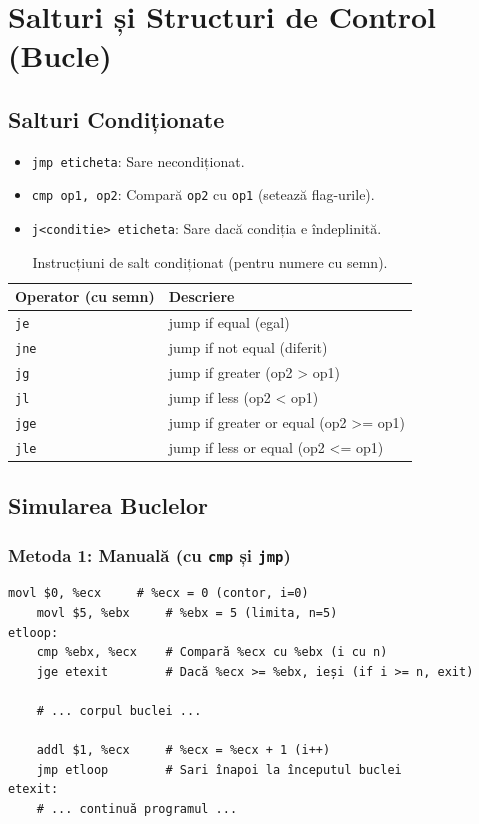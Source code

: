 \documentclass[12pt]{article}
\begin{document}
\section{Salturi și Structuri de Control (Bucle)}

\subsection{Salturi Condiționate}
\begin{itemize}
    \item \texttt{jmp eticheta}: Sare necondiționat.
    \item \texttt{cmp op1, op2}: Compară \texttt{op2} cu \texttt{op1} (setează flag-urile).
    \item \texttt{j<conditie> eticheta}: Sare dacă condiția e îndeplinită.
\end{itemize}

\begin{table}[h!]
\centering
\begin{tabular}{ll}
\toprule
\textbf{Operator (cu semn)} & \textbf{Descriere} \\
\midrule
\texttt{je} & jump if equal (egal) \\
\texttt{jne} & jump if not equal (diferit) \\
\texttt{jg} & jump if greater (op2 > op1) \\
\texttt{jl} & jump if less (op2 < op1) \\
\texttt{jge} & jump if greater or equal (op2 >= op1) \\
\texttt{jle} & jump if less or equal (op2 <= op1) \\
\bottomrule
\end{tabular}
\caption{Instrucțiuni de salt condiționat (pentru numere cu semn).}
\end{table}

\subsection{Simularea Buclelor}

\subsubsection{Metoda 1: Manuală (cu \texttt{cmp} și \texttt{jmp})}
\begin{lstlisting}[language=x86asm]
    movl $0, %ecx     # %ecx = 0 (contor, i=0)
    movl $5, %ebx     # %ebx = 5 (limita, n=5)
etloop:
    cmp %ebx, %ecx    # Compară %ecx cu %ebx (i cu n)
    jge etexit        # Dacă %ecx >= %ebx, ieși (if i >= n, exit)
    
    # ... corpul buclei ...
    
    addl $1, %ecx     # %ecx = %ecx + 1 (i++)
    jmp etloop        # Sari înapoi la începutul buclei
etexit:
    # ... continuă programul ...
\end{lstlisting}
\end{document}

